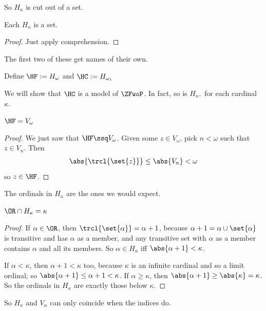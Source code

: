 So $H_{\kappa}$ is cut out of a set.

\begin{boxcorollary}
    Each $H_{\kappa}$ is a set.
\end{boxcorollary}
\begin{proof}
    Just apply comprehension.
\end{proof}

The first two of these get names of their own.

\begin{boxdefinition}
    Define $\HF := H_{\omega}$ and $\HC := H_{\omega_1}$
\end{boxdefinition}

We will show that $\HC$ is a model of $\ZFwoP$. In fact, so is $H_{\kappa^+}$ for each cardinal $\kappa$.

\begin{boxlemma}
    $\HF = V_{\omega}$
\end{boxlemma}
\begin{proof}
    We just saw that $\HF \ssq V_{\omega}$. Given some $z \in V_{\omega}$, pick $n < \omega$ such that $z \in V_n$. Then
    \begin{align*}
        \abs{\trcl{\set{z}}} \leq \abs{V_n} < \omega
    \end{align*}
    so $z \in \HF$.
\end{proof}

The ordinals in $H_{\kappa}$ are the ones we would expect.

\begin{boxlemma}
    $\OR \cap H_{\kappa} = \kappa$
\end{boxlemma}
\begin{proof}
    If $\alpha \in \OR$, then $\trcl{\set{\alpha}} = \alpha + 1$, because $\alpha + 1 = \alpha \cup \set{\alpha}$ is transitive and has $\alpha$ as a member, and any transitive set with $\alpha$ as a member contains $\alpha$ and all its members. So $\alpha \in H_{\kappa}$ iff $\abs{\alpha + 1} < \kappa$.

    If $\alpha < \kappa$, then $\alpha + 1 < \kappa$ too, because $\kappa$ is an infinite cardinal and so a limit ordinal; so $\abs{\alpha + 1} \leq \alpha + 1 < \kappa$. If $\alpha \geq \kappa$, then $\abs{\alpha + 1} \geq \abs{\kappa} = \kappa$. So the ordinals in $H_{\kappa}$ are exactly those below $\kappa$.
\end{proof}

So $H_{\kappa}$ and $V_{\alpha}$ can only coincide when the indices do.

